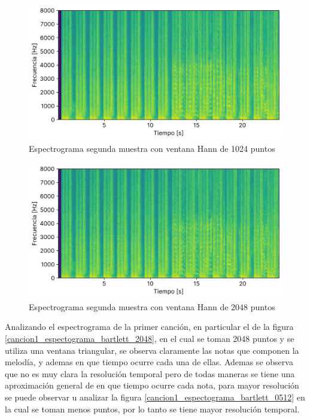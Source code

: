 \documentclass[12pt]{article}
\begin{document}
\begin{figure}[H]
\centering
\includegraphics{plot/cancion2_espectograma_hann_1024.png}
\caption{Espectrograma segunda muestra con ventana Hann de 1024 puntos}
\label{cancion2_espectograma_hann_1024}
\end{figure}

\begin{figure}[H]
\centering
\includegraphics{plot/cancion2_espectograma_hann_2048.png}
\caption{Espectrograma segunda muestra con ventana Hann de 2048 puntos}
\label{cancion2_espectograma_hann_2048}
\end{figure}

Analizando el espectrograma de la primer canción, en particular el de la figura
\ref{cancion1_espectograma_bartlett_2048}, en el cual se toman 2048 puntos y se
utiliza una ventana triangular, se observa claramente las notas que componen la
melodía, y ademas en que tiempo ocurre cada una de ellas. Ademas se observa que
no es muy clara la resolución temporal pero de todas maneras se tiene una
aproximación general de en que tiempo ocurre cada nota, para mayor resolución se
puede observar u analizar la figura \ref{cancion1_espectograma_bartlett_0512} en
la cual se toman menos puntos, por lo tanto se tiene mayor resolución temporal.
\end{document}
